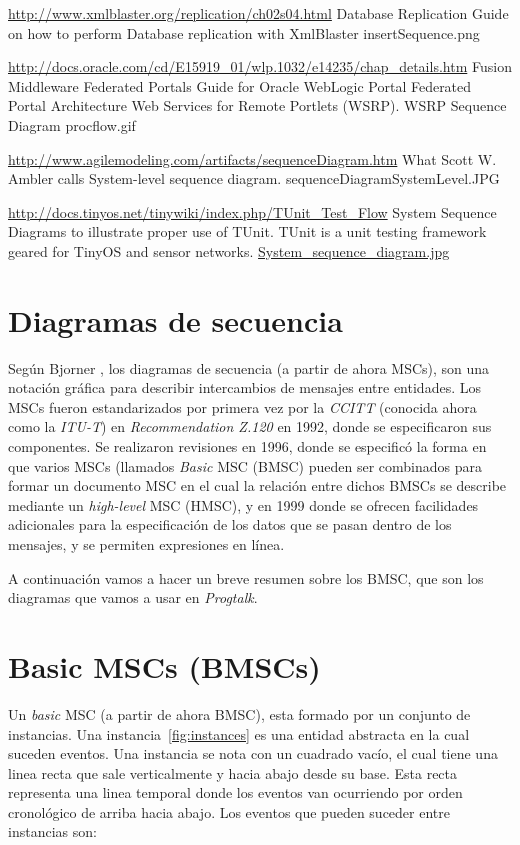 \url{http://www.xmlblaster.org/replication/ch02s04.html}
Database Replication
Guide on how to perform Database replication with XmlBlaster
insertSequence.png

\url{http://docs.oracle.com/cd/E15919_01/wlp.1032/e14235/chap_details.htm}
Fusion Middleware Federated Portals Guide for Oracle WebLogic Portal
Federated Portal Architecture
Web Services for Remote Portlets (WSRP).
WSRP Sequence Diagram
procflow.gif

\url{http://www.agilemodeling.com/artifacts/sequenceDiagram.htm}
What Scott W. Ambler calls System-level sequence diagram.
sequenceDiagramSystemLevel.JPG


\url{http://docs.tinyos.net/tinywiki/index.php/TUnit_Test_Flow}
System Sequence Diagrams to illustrate proper use of TUnit. TUnit is a unit testing framework geared for TinyOS and sensor networks. 
\url{System_sequence_diagram.jpg}



\section{Diagramas de secuencia}

Según Bjorner \cite{bjorner}, los diagramas de secuencia (a partir de
ahora MSCs), son una notación gráfica para describir intercambios de
mensajes entre entidades. Los MSCs fueron estandarizados por primera
vez por la \textit{CCITT} (conocida ahora como la \textit{ITU-T}) en
\textit{Recommendation Z.120} en 1992, donde se especificaron sus componentes.
Se realizaron revisiones en 1996, donde se especificó la
forma en que varios MSCs (llamados \textit{Basic} MSC (BMSC) pueden
ser combinados para formar un documento MSC en el cual la relación entre
dichos BMSCs se describe mediante un \textit{high-level} MSC (HMSC), y
en 1999 donde se ofrecen facilidades adicionales para la
especificación de los datos que se pasan dentro de los mensajes, y se
permiten expresiones en línea.

A continuación vamos a hacer un breve resumen sobre los BMSC, que son
los diagramas que vamos a usar en \textit{Progtalk}.

\section{Basic MSCs (BMSCs)}
Un \textit{basic} MSC (a partir de ahora BMSC), esta formado por un
conjunto de instancias. Una instancia~\ref{fig:instances} es una
entidad abstracta en la cual suceden eventos. Una instancia se nota
con un cuadrado vacío, el cual tiene una linea recta que sale
verticalmente y hacia abajo desde su base. Esta recta representa una
linea temporal donde los eventos van ocurriendo por orden cronológico
de arriba hacia abajo. Los eventos que pueden suceder entre instancias son:

